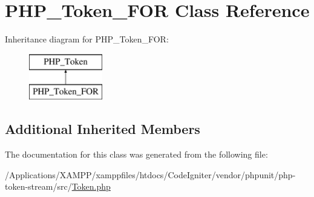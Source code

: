 \hypertarget{class_p_h_p___token___f_o_r}{}\section{P\+H\+P\+\_\+\+Token\+\_\+\+F\+OR Class Reference}
\label{class_p_h_p___token___f_o_r}
Inheritance diagram for P\+H\+P\+\_\+\+Token\+\_\+\+F\+OR\+:\begin{figure}[H]
\begin{center}
\leavevmode
\includegraphics[height=2.000000cm]{class_p_h_p___token___f_o_r}
\end{center}
\end{figure}
\subsection*{Additional Inherited Members}


The documentation for this class was generated from the following file\+:\begin{DoxyCompactItemize}
\item 
/\+Applications/\+X\+A\+M\+P\+P/xamppfiles/htdocs/\+Code\+Igniter/vendor/phpunit/php-\/token-\/stream/src/\mbox{\hyperlink{_token_8php}{Token.\+php}}\end{DoxyCompactItemize}
